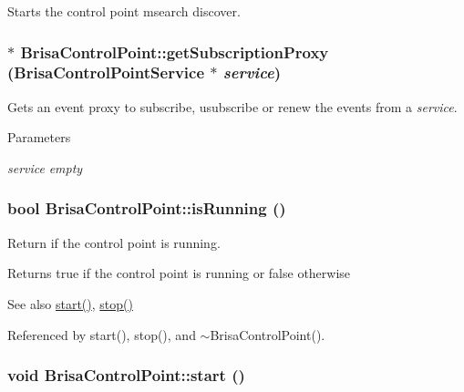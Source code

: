Starts the control point msearch discover. \hypertarget{classBrisaUpnp_1_1BrisaControlPoint_aa1e4c21f1bc2e492c3e4dc88c06b4f32}{
\subsubsection[{getSubscriptionProxy}]{ $\ast$ BrisaControlPoint::getSubscriptionProxy ({\bf BrisaControlPointService} $\ast$ {\em service})}}
\label{classBrisaUpnp_1_1BrisaControlPoint_aa1e4c21f1bc2e492c3e4dc88c06b4f32}


Gets an event proxy to subscribe, usubscribe or renew the events from a {\itshape service\/}. 
\begin{DoxyParams}{Parameters}
\item[{\em service}]{\itshape empty\/} \end{DoxyParams}
\hypertarget{classBrisaUpnp_1_1BrisaControlPoint_ac42e2c437a1ced595f407d7ce386cf81}{
\subsubsection[{isRunning}]{\setlength{\rightskip}{0pt plus 5cm}bool BrisaControlPoint::isRunning ()}}
\label{classBrisaUpnp_1_1BrisaControlPoint_ac42e2c437a1ced595f407d7ce386cf81}


Return if the control point is running. \begin{DoxyReturn}{Returns}
true if the control point is running or false otherwise 
\end{DoxyReturn}
\begin{DoxySeeAlso}{See also}
\hyperlink{classBrisaUpnp_1_1BrisaControlPoint_ab370001909d0f7b0ec059b693675d964}{start()}, \hyperlink{classBrisaUpnp_1_1BrisaControlPoint_a39876b0ff6901907710cd6f7782c4f52}{stop()} 
\end{DoxySeeAlso}


Referenced by start(), stop(), and $\sim$BrisaControlPoint().\hypertarget{classBrisaUpnp_1_1BrisaControlPoint_ab370001909d0f7b0ec059b693675d964}{
\subsubsection[{start}]{\setlength{\rightskip}{0pt plus 5cm}void BrisaControlPoint::start ()}}
\label{classBrisaUpnp_1_1BrisaControlPoint_ab370001909d0f7b0ec059b693675d964}


